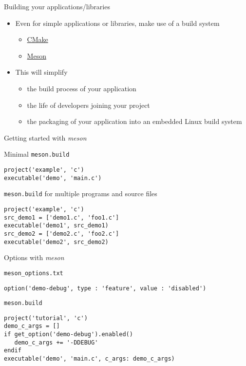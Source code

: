 \begin{frame}{Building your applications/libraries}
  \begin{itemize}
  \item Even for simple applications or libraries, make use of a build
    system
    \begin{itemize}
    \item \href{https://cmake.org/}{CMake}
    \item \href{https://mesonbuild.com/}{Meson}
    \end{itemize}
  \item This will simplify
    \begin{itemize}
    \item the build process of your application
    \item the life of developers joining your project
    \item the packaging of your application into an embedded Linux
      build system
    \end{itemize}
  \end{itemize}
\end{frame}

\begin{frame}[fragile]{Getting started with {\em meson}}
  \begin{block}{Minimal {\tt meson.build}}
\begin{verbatim}
project('example', 'c')
executable('demo', 'main.c')
\end{verbatim}
  \end{block}

  \begin{block}{{\tt meson.build} for multiple programs and source files}
\begin{verbatim}
project('example', 'c')
src_demo1 = ['demo1.c', 'foo1.c']
executable('demo1', src_demo1)
src_demo2 = ['demo2.c', 'foo2.c']
executable('demo2', src_demo2)
\end{verbatim}
  \end{block}
\end{frame}

\begin{frame}[fragile]{Options with {\em meson}}
  \begin{block}{{\tt meson\_options.txt}}
\begin{verbatim}
option('demo-debug', type : 'feature', value : 'disabled')
\end{verbatim}
  \end{block}

  \begin{block}{{\tt meson.build}}
\begin{verbatim}
project('tutorial', 'c')
demo_c_args = []
if get_option('demo-debug').enabled()
   demo_c_args += '-DDEBUG'
endif
executable('demo', 'main.c', c_args: demo_c_args)
\end{verbatim}
  \end{block}
\end{frame}

